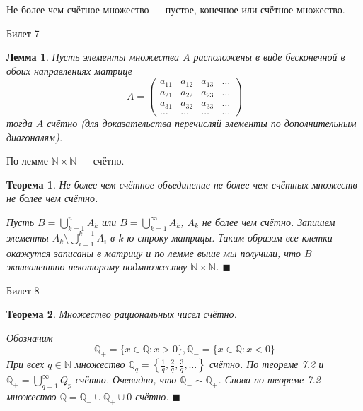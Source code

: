 \documentclass[12pt,a4paper]{article}
\newtheorem*{theorem*}{Теорема}
\newtheorem*{lemma*}{Лемма}
\begin{document}
Не более чем счётное множество --- пустое, конечное или счётное множество.

\begin{center}
Билет 7
\end{center}

\begin{lemma*}
\label{7.1}
Пусть элементы множества $A$ расположены в виде бесконечной в обоих направлениях матрице
$$
A=
\begin{pmatrix}
a_{11} & a_{12} & a_{13} & \ldots \\
a_{21} & a_{22} & a_{23} & \ldots \\
a_{31} & a_{32} & a_{33} & \ldots \\ 
\ldots & \ldots & \ldots & \ldots
\end{pmatrix}
$$
тогда $A$ счётно (для доказательства перечисляй элементы по дополнительным диагоналям).
\end{lemma*}

По лемме $\mathbb{N} \times \mathbb{N}$ --- счётно.

\begin{theorem*}
\label{7.2}
Не более чем счётное объединение не более чем счётных множеств не более чем счётно.

Пусть $B=\bigcup\limits_{k=1}^{n} A_k$ или $B=\bigcup\limits_{k=1}^{\infty} A_k$, $A_k$ не более чем счётно. Запишем элементы $A_k \setminus \bigcup\limits_{i=1}^{k-1} A_i$ в $k$-ю строку матрицы. Таким образом все клетки окажутся записаны в матрицу и по лемме выше мы получили, что $B$ эквивалентно некоторому подмножеству $\mathbb{N} \times \mathbb{N}$. $\blacksquare$
\end{theorem*}

\begin{center}
Билет 8
\end{center}

\begin{theorem*}
\label{8.1}
Множество рациональных чисел счётно.

Обозначим 
$$
\mathbb{Q}_{+} = \{x \in \mathbb{Q}: x>0\}, \mathbb{Q}_{-} = \{x \in \mathbb{Q}: x < 0\}
$$ 
При всех $q \in \mathbb{N}$ множество $\mathbb{Q}_{q} = \left\lbrace \frac{1}{q}, \frac{2}{q}, \frac{3}{q}, \ldots \right\rbrace$ счётно. По теореме 7.2 и $\mathbb{Q}_{+} = \bigcup_{q=1}^{\infty} Q_p$ счётно. Очевидно, что $\mathbb{Q}_{-} \sim \mathbb{Q}_{+}$. Снова по теореме 7.2 множество $\mathbb{Q} = \mathbb{Q}_{-} \cup \mathbb{Q}_{+} \cup {0}$ счётно. $\blacksquare$
\end{theorem*}
\end{document}
